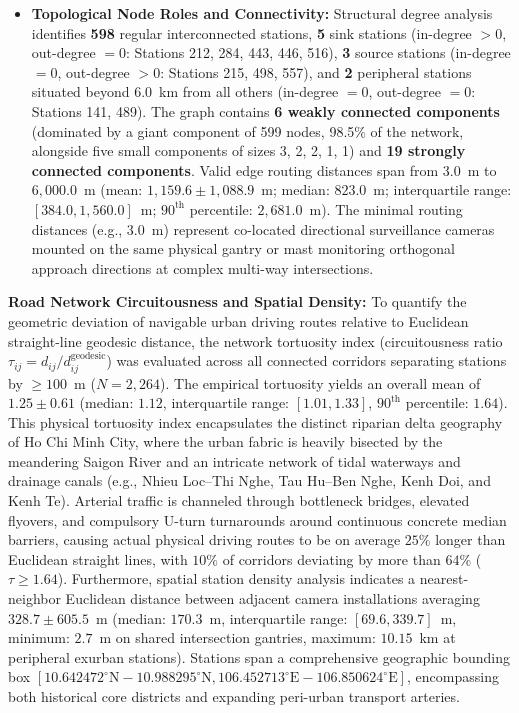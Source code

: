 \documentclass[preprint,12pt]{elsarticle}
\begin{document}
\begin{itemize}
    \item \textbf{Topological Node Roles and Connectivity:} Structural degree analysis identifies \textbf{598} regular interconnected stations, \textbf{5} sink stations (in-degree $>0$, out-degree $=0$: Stations 212, 284, 443, 446, 516), \textbf{3} source stations (in-degree $=0$, out-degree $>0$: Stations 215, 498, 557), and \textbf{2} peripheral stations situated beyond $6.0$~km from all others (in-degree $=0$, out-degree $=0$: Stations 141, 489). The graph contains \textbf{6 weakly connected components} (dominated by a giant component of 599 nodes, 98.5\% of the network, alongside five small components of sizes 3, 2, 2, 1, 1) and \textbf{19 strongly connected components}. Valid edge routing distances span from $3.0$~m to $6,000.0$~m (mean: $1,159.6 \pm 1,088.9$~m; median: $823.0$~m; interquartile range: $[384.0, 1,560.0]$~m; $90^{\text{th}}$ percentile: $2,681.0$~m). The minimal routing distances (e.g., $3.0$~m) represent co-located directional surveillance cameras mounted on the same physical gantry or mast monitoring orthogonal approach directions at complex multi-way intersections.
\end{itemize}

\textbf{Road Network Circuitousness and Spatial Density:} To quantify the geometric deviation of navigable urban driving routes relative to Euclidean straight-line geodesic distance, the network tortuosity index (circuitousness ratio $\tau_{ij} = d_{ij} / d_{ij}^{\text{geodesic}}$) was evaluated across all connected corridors separating stations by $\ge 100$~m ($N = 2,264$). The empirical tortuosity yields an overall mean of $\mathbf{1.25 \pm 0.61}$ (median: $\mathbf{1.12}$, interquartile range: $[1.01, 1.33]$, $90^{\text{th}}$ percentile: $1.64$). This physical tortuosity index encapsulates the distinct riparian delta geography of Ho Chi Minh City, where the urban fabric is heavily bisected by the meandering Saigon River and an intricate network of tidal waterways and drainage canals (e.g., Nhieu Loc--Thi Nghe, Tau Hu--Ben Nghe, Kenh Doi, and Kenh Te). Arterial traffic is channeled through bottleneck bridges, elevated flyovers, and compulsory U-turn turnarounds around continuous concrete median barriers, causing actual physical driving routes to be on average $25\%$ longer than Euclidean straight lines, with $10\%$ of corridors deviating by more than $64\%$ ($\tau \ge 1.64$). Furthermore, spatial station density analysis indicates a nearest-neighbor Euclidean distance between adjacent camera installations averaging $\mathbf{328.7 \pm 605.5}$~m (median: $\mathbf{170.3}$~m, interquartile range: $[69.6, 339.7]$~m, minimum: $2.7$~m on shared intersection gantries, maximum: $10.15$~km at peripheral exurban stations). Stations span a comprehensive geographic bounding box $[10.642472^\circ\text{N} - 10.988295^\circ\text{N}, 106.452713^\circ\text{E} - 106.850624^\circ\text{E}]$, encompassing both historical core districts and expanding peri-urban transport arteries.
\end{document}
